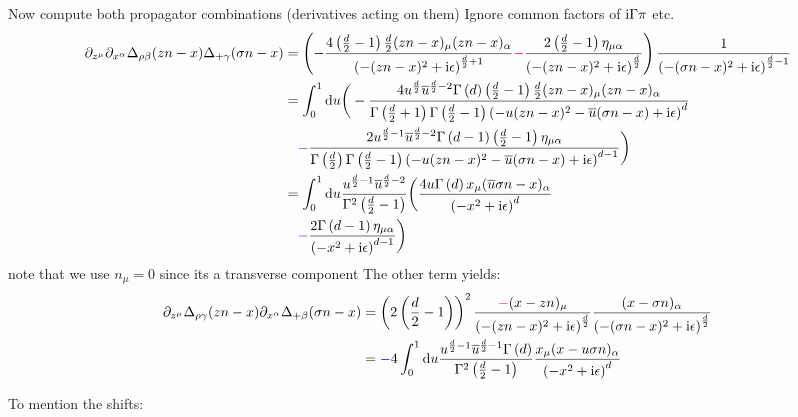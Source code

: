 Now compute both propagator combinations (derivatives acting on them)
Ignore common factors of $\text{i} \Gamma \pi$ etc.
\begin{align}
\partial_{z^\mu} \partial_{x^\alpha} \Delta_{\rho \beta}(zn-x) \Delta_{+ \gamma}(\sigma n -x)
&=
\left(-\frac{4 \left(\frac{d}{2}-1\right)\frac{d}{2}(zn-x)_\mu (zn-x)_\alpha}{\left(-(zn-x)^2 +\text{i} \epsilon\right)^{\frac{d}{2}+1}} {\color{red}-} \frac{2\left( \frac{d}{2}-1\right) \eta_{\mu \alpha} }{\left(-(zn-x)^2 +\text{i} \epsilon\right)^{\frac{d}{2}}}\right)\frac{1}{\left(-(\sigma n-x)^2 + \text{i} \epsilon\right)^{\frac{d}{2}-1}}
\\
&=
\int_{0}^{1} \text{d} u 	\bigg(-\frac{4 u^{\frac{d}{2}} \overline u^{\frac{d}{2}-2} \Gamma\left( d \right) \left(\frac{d}{2}-1\right)\frac{d}{2}(zn-x)_\mu (zn-x)_\alpha}{\Gamma\left( \frac{d}{2} +1 \right) \Gamma\left( \frac{d}{2} -1 \right)\left(-u(zn-x)^2 - \overline u(\sigma n -x) +\text{i} \epsilon\right)^{d}} 
\\&~~~
{\color{blue}-} \frac{2u^{\frac{d}{2}-1} \overline u ^{\frac{d}{2}-2}\Gamma\left( d-1 \right)\left( \frac{d}{2}-1\right) \eta_{\mu \alpha} }{\Gamma\left( \frac{d}{2}\right)\Gamma\left( \frac{d}{2} -1 \right)\left(-u(zn-x)^2 - \overline u(\sigma n -x) +\text{i} \epsilon\right)^{d-1}}\bigg)
\\
&=
\int_{0}^{1} \text{d} u \frac{ u^{\frac{d}{2}-1} \overline u^{\frac{d}{2}-2} }{\Gamma^2\left( \frac{d}{2} -1 \right)}	\bigg(\frac{4 u \Gamma\left( d \right) x_\mu (\overline u\sigma n-x)_\alpha}{\left(-x^2 +\text{i} \epsilon\right)^{d}} 
\\&~~~
{\color{blue}-} \frac{2\Gamma\left( d-1 \right) \eta_{\mu \alpha} }{\left(-x^2+\text{i} \epsilon\right)^{d-1}}\bigg)
\label{randomstep1}
\end{align}
note that we use $n_\mu=0$ since its a transverse component
The other term yields:
\begin{align}
\partial_{z^\mu}  \Delta_{\rho \gamma}(zn-x) \partial_{x^\alpha}\Delta_{+ \beta}(\sigma n -x)
&=
\left(2 \left(\frac{d}{2}-1\right)\right)^2 \frac{{\color{red}-}(x-zn)_\mu}{\left(-(zn-x)^2+ \text{i} \epsilon\right)^{\frac{d}{2}}} \frac{(x-\sigma n)_\alpha}{\left(-(\sigma n-x)^2+ \text{i} \epsilon\right)^{\frac{d}{2}}}
\\
&=
{\color{blue}-}4\int_{0}^{1} \text{d} u \frac{u^{\frac{d}{2}-1} \overline u^{\frac{d}{2}-1}\Gamma\left( d \right)}{\Gamma^2\left( \frac{d}{2}-1 \right)}\frac{x_\mu(x -  u\sigma n)_\alpha}{\left(-x^2 + \text{i} \epsilon\right)^{d}}
\label{randomstep2}
\end{align}

To mention the shifts:

